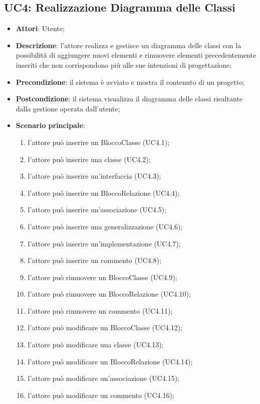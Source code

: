 \subsection{UC4: Realizzazione Diagramma delle Classi}
\label{UC4}
\begin{itemize}
	\item \textbf{Attori}: Utente;
	\item \textbf{Descrizione}: l'attore realizza e gestisce un diagramma delle classi con la possibilità di aggiungere nuovi elementi e rimuovere elementi precedentemente inseriti che non corrispondono più alle sue intenzioni di progettazione;
	\item \textbf{Precondizione}: il sistema è avviato e mostra il contenuto di un progetto;
	\item \textbf{Postcondizione}: il sistema visualizza il diagramma delle classi risultante dalla gestione operata dall'utente;
	\item \textbf{Scenario principale}:
	\begin{enumerate}
		\item l'attore può inserire un BloccoClasse (UC4.1);
		\item l'attore può inserire una classe (UC4.2);
		\item l'attore può inserire un'interfaccia (UC4.3);
		\item l'attore può inserire un BloccoRelazione (UC4.4);
		\item l'attore può inserire un'associazione (UC4.5);
		\item l'attore può inserire una generalizzazione (UC4.6);
		\item l'attore può inserire un'implementazione (UC4.7);
		\item l'attore può inserire un commento (UC4.8);
		\item l'attore può rimuovere un BloccoClasse (UC4.9);
		\item l'attore può rimuovere un BloccoRelazione (UC4.10);
		\item l'attore può rimuovere un commento (UC4.11);
		\item l'attore può modificare un BloccoClasse (UC4.12);
		\item l'attore può modificare una classe (UC4.13);
		\item l'attore può modificare un BloccoRelazione (UC4.14);
		\item l'attore può modificare un'associazione (UC4.15);
		\item l'attore può modificare un commento (UC4.16);

\end{enumerate}
\end{itemize}
